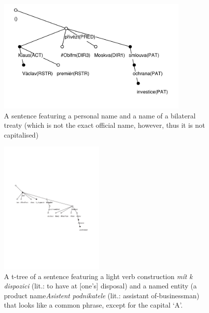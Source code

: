 \begin{figure}[htbp]
   \centerline{\includegraphics[width=3.7in]{images/klaus-a-smlouva.pdf}}
   \caption{A sentence featuring a personal name and a name of a bilateral treaty (which is not the exact official name, however, thus it is not capitalised)}
   \label{fig:klaus}
\end{figure}

\begin{figure}[htbp]
   \centerline{\includegraphics[height=2.6in]{images/as-pod.pdf}}
   \caption{A t-tree of a sentence featuring a light verb construction \emph{mít k dispozici} (lit.: to have at [one's] disposal) and a named entity (a product name\emph{Asistent podnikatele} (lit.: assistant of-businessman) that looks like a common phrase, except for the capital `A'.}
   \label{fig:asistent}
\end{figure}

